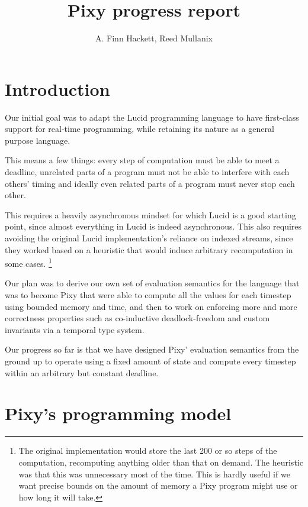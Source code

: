 \documentclass{scrartcl}
\begin{document}
    \title{Pixy progress report}
    \author{A. Finn Hackett, Reed Mullanix}
    
    \maketitle
    
    \tableofcontents
    
    \section{Introduction}
    
    Our initial goal was to adapt the Lucid programming language to have first-class support for real-time programming, while retaining its nature as a general purpose language.
    
    This means a few things: every step of computation must be able to meet a deadline, unrelated parts of a program must not be able to interfere with each others' timing and ideally even related parts of a program must never stop each other.
    
    This requires a heavily asynchronous mindset for which Lucid is a good starting point, since almost everything in Lucid is indeed asynchronous. This also requires avoiding the original Lucid implementation's reliance on indexed streams, since they worked based on a heuristic \cite[pages 67-68]{wadgeashcroft85} that would induce arbitrary recomputation in some cases. \footnote{The original implementation would store the last 200 or so steps of the computation, recomputing anything older than that on demand. The heuristic was that this was unnecessary most of the time. This is hardly useful if we want precise bounds on the amount of memory a Pixy program might use or how long it will take.}
    
    Our plan was to derive our own set of evaluation semantics for the language that was to become Pixy that were able to compute all the values for each timestep using bounded memory and time, and then to work on enforcing more and more correctness properties such as co-inductive deadlock-freedom and custom invariants via a temporal type system.
    
    Our progress so far is that we have designed Pixy' evaluation semantics from the ground up to operate using a fixed amount of state and compute every timestep within an arbitrary but constant deadline.
    
    \section{Pixy's programming model}
    
\end{document}

